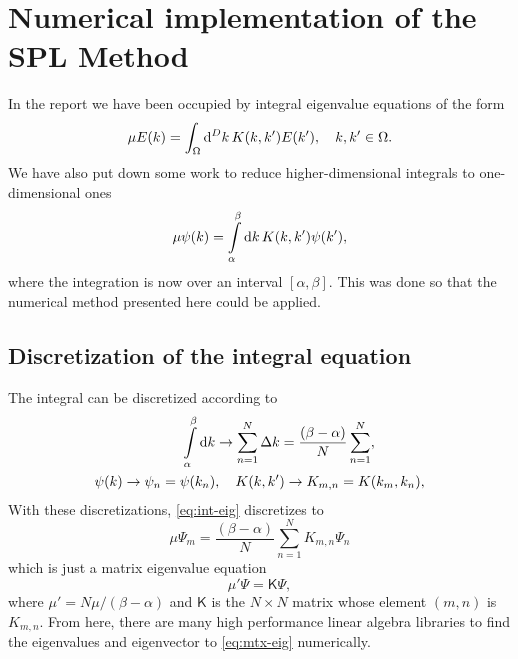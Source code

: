 \documentclass[11pt,a4paper, 
swedish,english %
]{article}
\begin{document}
\clearpage %
\appendix  %


\section{Numerical implementation of the 
SPL Method}
\label{apx:num}
In the report we have been occupied by integral eigenvalue
equations of the form
\begin{equation} %
\mu E(k) 
= \oldint_{\Omega} \rd^D{k}\, K(k, k') E(k')
\qcomma k, k'\in\Omega.
\end{equation}
We have also put down some work to reduce higher-dimensional
integrals to one-dimensional ones
\begin{equation} \label{eq:int-eig}
\mu \psi(k) 
= \int_{\alpha}^\beta \rd{k}\, K(k, k') \psi(k'),
\end{equation}
where the integration is now over an interval 
$[\alpha, \beta]$. This was done so that the numerical method
presented here could be applied. 


\subsection{Discretization of the integral equation}
The integral can be discretized according to
\begin{equation} \label{eq:inttosum}
\begin{aligned}
 \int_{\alpha}^\beta \rd{k} &\to \sum_{n=1}^N\Delta{k}
=\frac{(\beta-\alpha)}{N} \sum_{n=1}^N,\\
\psi(k) \to \psi_n = \psi(k_n) &\qcomma
K(k, k') \to K_{m, n} = K(k_m, k_n),
\end{aligned}
\end{equation}
With these discretizations, \eqref{eq:int-eig} discretizes to
\begin{equation}
\mu\Psi_m = \frac{(\beta-\alpha)}{N} \sum_{n=1}^N K_{m, n} \Psi_n
\end{equation}
which is just a matrix eigenvalue equation
\begin{equation} \label{eq:mtx-eig}
\mu' \Psi = \mathsf{K}\Psi,
\end{equation}
where $\mu'=N\mu/(\beta-\alpha)$ and $\mathsf{K}$ is the $N\times N$ matrix
whose element $(m, n)$ is $K_{m, n}$. From here, there are many high
performance linear algebra libraries to find the eigenvalues and
eigenvector to \eqref{eq:mtx-eig} numerically. 
\end{document}
